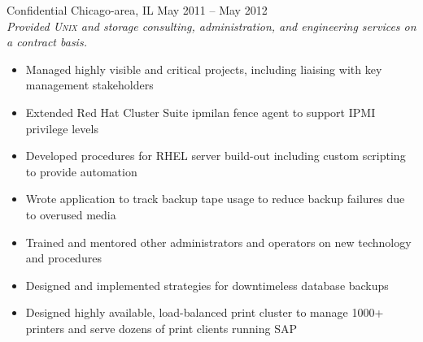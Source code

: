 \documentclass[9pt]{extarticle} %
\begin{document}
\begin{indented}
	Confidential \tab Chicago-area, IL \tab May 2011 -- May 2012\\
	\textit{Provided \textsc{Unix} and storage consulting, administration, and engineering services on a contract basis.}
	\begin{itemize}
		\item Managed highly visible and critical projects, including liaising with key management stakeholders
		\item Extended Red Hat Cluster Suite ipmilan fence agent to support IPMI privilege levels
		\item Developed procedures for RHEL server build-out including custom scripting to provide automation
		\item Wrote application to track backup tape usage to reduce backup failures due to overused media
		\item Trained and mentored other administrators and operators on new technology and procedures
		\item Designed and implemented strategies for downtimeless database backups
		\item Designed highly available, load-balanced print cluster to manage 1000+ printers and serve dozens of print clients running SAP
	\end{itemize}
\end{indented}

\bigskip


\end{document}
